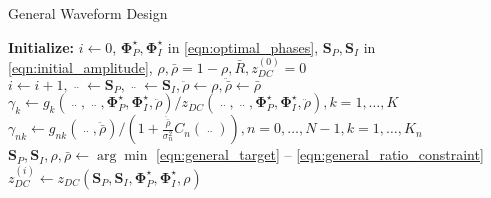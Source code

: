 \begin{algorithm}
  \caption{General Waveform Design}
  \label{alg:general}
  \begin{algorithmic}[1]
    \State \textbf{Initialize:} $i \leftarrow 0$, ${\mathbf{\Phi }}_P^ \star ,{\mathbf{\Phi }}_I^ \star $ in \ref{eqn:optimal_phases}, ${{{\mathbf{S}}_P},{{\mathbf{S}}_I}}$ in \ref{eqn:initial_amplitude}, $\rho ,\bar \rho  = 1 - \rho ,\bar R,z_{DC}^{(0)} = 0$
    \Repeat
      \State $i \leftarrow i + 1,\mathop {{{\mathbf{S}}_P}}\limits^{..}  \leftarrow {{\mathbf{S}}_P},\mathop {{{\mathbf{S}}_P}}\limits^{..}  \leftarrow {{\mathbf{S}}_I},\ddot \rho  \leftarrow \rho ,\ddot \bar \rho  \leftarrow \bar \rho $
      \State ${\gamma _k} \leftarrow {g_k}\left( {\mathop {{{\mathbf{S}}_P}}\limits^{..} ,\mathop {{{\mathbf{S}}_I}}\limits^{..} ,{\mathbf{\Phi }}_P^ \star ,{\mathbf{\Phi }}_I^ \star ,\ddot \rho } \right)/{z_{DC}}\left( {\mathop {{{\mathbf{S}}_P}}\limits^{..} ,\mathop {{{\mathbf{S}}_I}}\limits^{..} ,{\mathbf{\Phi }}_P^ \star ,{\mathbf{\Phi }}_I^ \star ,\ddot \rho } \right),k = 1, \ldots ,K$
      \State ${\gamma _{nk}} \leftarrow {g_{nk}}\left( {\mathop {{{\mathbf{S}}_I}}\limits^{..} ,\ddot \bar \rho } \right)/\left( {1 + \frac{{\ddot \bar \rho }}{{\sigma _n^2}}{C_n}\left( {\mathop {{{\mathbf{S}}_I}}\limits^{..} } \right)} \right),n = 0, \ldots ,N - 1,k = 1, \ldots ,{K_n}$
      \State ${{\mathbf{S}}_P},{{\mathbf{S}}_I},\rho ,\bar \rho  \leftarrow \arg \min $ \ref{eqn:general_target} -- \ref{eqn:general_ratio_constraint}
      \State $z_{DC}^{(i)} \leftarrow {z_{DC}}\left( {{{\mathbf{S}}_P},{{\mathbf{S}}_I},{\mathbf{\Phi }}_P^ \star ,{\mathbf{\Phi }}_I^ \star ,\rho } \right)$
  \end{algorithmic}
\end{algorithm} 
